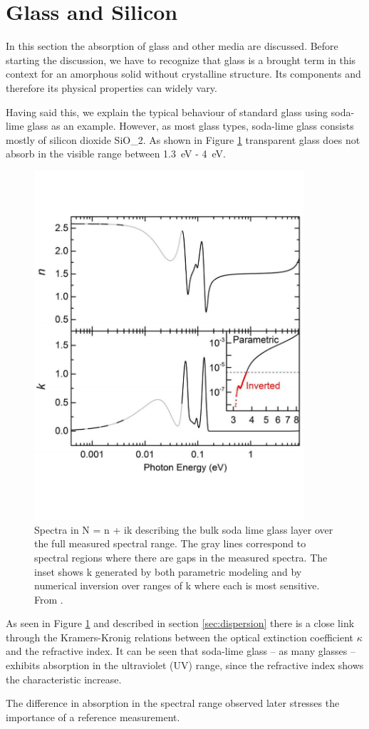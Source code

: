 \section{Glass and Silicon}
\label{sec:GlassAndSilicon}
In this section the absorption of glass and other media are discussed. Before starting the discussion, we have to 
recognize that glass is a brought term in this context for an amorphous solid without crystalline structure.
Its components and therefore its physical properties can widely vary.

Having said this, we explain the typical behaviour of standard glass using soda-lime glass as an example. However, as most glass types, soda-lime glass consists mostly of silicon dioxide SiO_2. As shown 
in Figure \ref{fig:SodaLimeGlass} transparent glass does not absorb in the visible range between \SI{1.3}{eV} - \SI{4}{eV}.

\begin{figure}[ht]
    \centering
    \includegraphics[width = 10cm]{Bilder/Grundlagen/SodalimePic.pdf}
    \caption{Spectra in N = n + ik describing the bulk soda lime glass layer over the full measured spectral range. The
    gray lines correspond to spectral regions where there are gaps in the measured spectra. The inset shows k generated
    by both parametric modeling and by numerical inversion over ranges of k where each is most sensitive. From \cite[]{Junda.2018}.}
    \label{fig:SodaLimeGlass}
\end{figure}

As seen in Figure \ref{fig:SodaLimeGlass} and described in section \ref{sec:dispersion} there is a close link through the Kramers-Kronig relations
between the optical extinction coefficient $\kappa$ and the refractive index. It can be seen 
that soda-lime glass -- as many glasses -- exhibits absorption in the ultraviolet (UV) range, since the refractive index 
shows the characteristic increase.  

The difference in absorption in the spectral range observed later stresses the importance of a reference measurement.